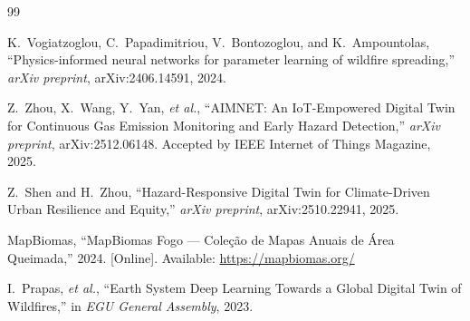 \documentclass[preprint,times,numbers]{elsarticle}
\begin{document}
\begin{thebibliography}{99}

K.~Vogiatzoglou, C.~Papadimitriou, V.~Bontozoglou, and K.~Ampountolas, ``Physics-informed neural networks for parameter learning of wildfire spreading,'' \textit{arXiv preprint}, arXiv:2406.14591, 2024.

Z.~Zhou, X.~Wang, Y.~Yan, \emph{et al.}, ``AIMNET: An IoT-Empowered Digital Twin for Continuous Gas Emission Monitoring and Early Hazard Detection,'' \textit{arXiv preprint}, arXiv:2512.06148. Accepted by IEEE Internet of Things Magazine, 2025.

Z.~Shen and H.~Zhou, ``Hazard-Responsive Digital Twin for Climate-Driven Urban Resilience and Equity,'' \textit{arXiv preprint}, arXiv:2510.22941, 2025.

MapBiomas, ``MapBiomas Fogo --- Coleção de Mapas Anuais de Área Queimada,'' 2024. [Online]. Available: \url{https://mapbiomas.org/}

I.~Prapas, \emph{et al.}, ``Earth System Deep Learning Towards a Global Digital Twin of Wildfires,'' in \textit{EGU General Assembly}, 2023.

\end{thebibliography}
\end{document}
